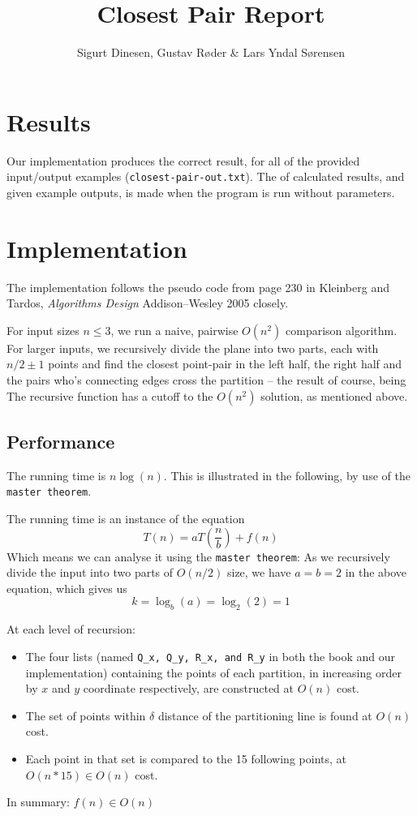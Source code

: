 \documentclass{tufte-handout}
\title{Closest Pair Report}
\author{Sigurt Dinesen, Gustav Røder \& Lars Yndal Sørensen}
\begin{document}
\maketitle

\section{Results}
Our implementation
produces the correct result, for all of the provided input/output examples
(\texttt{closest-pair-out.txt}). The of calculated results, and given
example outputs, is made when the program is run without parameters.

\section{Implementation}
The implementation follows the pseudo code from page 230 in Kleinberg and
Tardos, \emph{Algorithms Design} Addison--Wesley 2005 closely.

For input sizes $n \leq 3$, we run a naive, pairwise $O(n^2)$ comparison algorithm.
For larger inputs, we recursively divide the plane into two parts, each with
$n/2 \pm 1$ points and find the closest point-pair in the left half, the right
half and the pairs who's connecting edges cross the partition -- the result of
course, being  The recursive
function has a cutoff to the $O(n^2)$ solution, as mentioned above.

\subsection{Performance}
The running time is $n \log(n)$. This is illustrated in the following, by use of
the \texttt{master theorem}.

The running time is an instance of the equation
$$T(n) = a T\left(\frac{n}{b}\right) + f\left(n\right)$$
Which means we can analyse it using the \texttt{master theorem}:
As we recursively divide the input into two parts of $O(n/2)$ size, we have
$a=b=2$ in the above equation, which gives us
$$k = \log_b(a) = \log_2(2) = 1$$

At each level of recursion:
\begin{itemize}
	\item The four lists (named \texttt{Q\_x, Q\_y, R\_x, and R\_y} in both
		the book and our implementation) containing the points of each
		partition, in increasing order by $x$ and $y$ coordinate
		respectively, are constructed at $O(n)$ cost.

	\item The set of points within $\delta$ distance of the partitioning
		line is found at $O(n)$ cost.

	\item Each point in that set is compared to the 15 following points, at
		$O(n*15) \in O(n)$ cost.
\end{itemize}
In summary: $f\left(n\right) \in O(n)$
\end{document}
